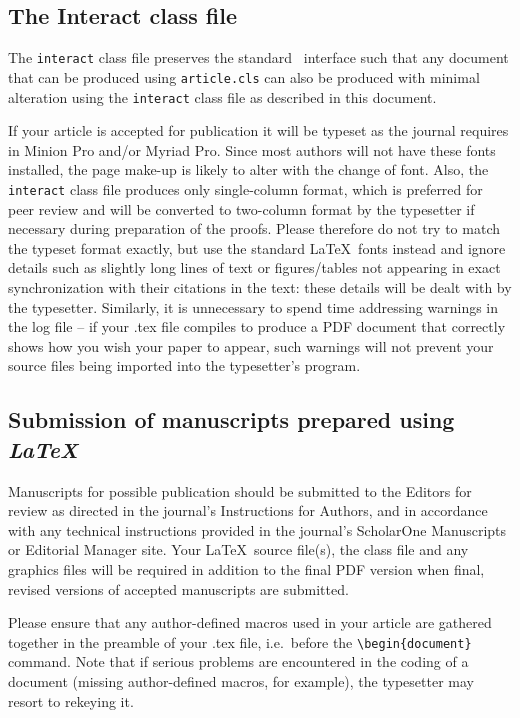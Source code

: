 \documentclass[]{interact}
\theoremstyle{plain}%
\theoremstyle{definition}
\theoremstyle{remark}
\begin{document}
\subsection{The \textsf{Interact} class file}\label{class}

The \texttt{interact} class file preserves the standard \LaTeXe\ interface such that any document that can be produced using \texttt{article.cls} can also be produced with minimal alteration using the \texttt{interact} class file as described in this document.

If your article is accepted for publication it will be typeset as the journal requires in Minion Pro and/or Myriad Pro. Since most authors will not have these fonts installed, the page make-up is likely to alter with the change of font. Also, the \texttt{interact} class file produces only single-column format, which is preferred for peer review and will be converted to two-column format by the typesetter if necessary during preparation of the proofs. Please therefore do not try to match the typeset format exactly, but use the standard \LaTeX\ fonts instead and ignore details such as slightly long lines of text or figures/tables not appearing in exact synchronization with their citations in the text: these details will be dealt with by the typesetter. Similarly, it is unnecessary to spend time addressing warnings in the log file -- if your .tex file compiles to produce a PDF document that correctly shows how you wish your paper to appear, such warnings will not prevent your source files being imported into the typesetter's program.


\subsection{Submission of manuscripts prepared using \emph{\LaTeX}}

Manuscripts for possible publication should be submitted to the Editors for review as directed in the journal's Instructions for Authors, and in accordance with any technical instructions provided in the journal's ScholarOne Manuscripts or Editorial Manager site. Your \LaTeX\ source file(s), the class file and any graphics files will be required in addition to the final PDF version when final, revised versions of accepted manuscripts are submitted.

Please ensure that any author-defined macros used in your article are gathered together in the preamble of your .tex file, i.e.\ before the \verb"\begin{document}" command.
Note that if serious problems are encountered in the coding of a document (missing author-defined macros, for example), the typesetter may resort to rekeying it.
\end{document}
